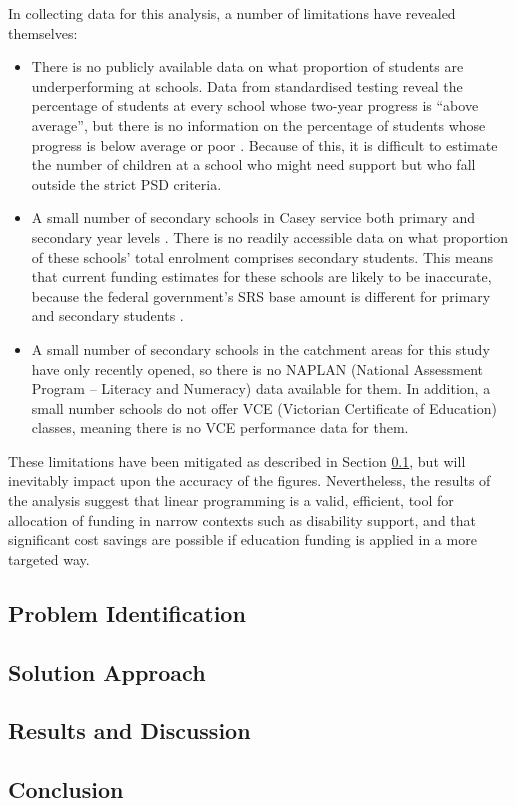 \documentclass[11pt, a4paper]{article}
\begin{document}
    In collecting data for this analysis, a number of limitations have revealed themselves:

    \begin{itemize}
        \item There is no publicly available data on what proportion of students are underperforming at schools. Data from standardised testing reveal the percentage of students at every school whose two-year progress is ``above average'', but there is no information on the percentage of students whose progress is below average or poor \parencite{naplan}. Because of this, it is difficult to estimate the number of children at a school who might need support but who fall outside the strict PSD criteria. 
        \item A small number of secondary schools in Casey service both primary and secondary year levels \parencite{casey_schools}. There is no readily accessible data on what proportion of these schools' total enrolment comprises secondary students. This means that current funding estimates for these schools are likely to be inaccurate, because the federal government's SRS base amount is different for primary and secondary students \parencite{srs_2020}.
        \item A small number of secondary schools in the catchment areas for this study have only recently opened, so there is no NAPLAN (National Assessment Program – Literacy and Numeracy) data available for them. In addition, a small number schools do not offer VCE (Victorian Certificate of Education) classes, meaning there is no VCE performance data for them.
    \end{itemize}

    These limitations have been mitigated as described in Section \ref{problem_identification}, but will inevitably impact upon the accuracy of the figures. Nevertheless, the results of the analysis suggest that linear programming is a valid, efficient, tool for allocation of funding in narrow contexts such as disability support, and that significant cost savings are possible if education funding is applied in a more targeted way.  

    \subsection{Problem Identification} \label{problem_identification}




    \subsection{Solution Approach}



    \subsection{Results and Discussion}



    \subsection{Conclusion}



    \newpage

    \printbibliography 
\end{document}
